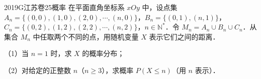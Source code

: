 
\begin{problem}{2019}{G}{江苏卷}{25}{概率}
在平面直角坐标系 $xOy$ 中，设点集 $A_n=\{(0,0),(1,0),(2,0),\cdots,(n,0)\}$，$B_n=\{(0,1),(n,1)\}$，$C_n=\{(0,2),(1,2),(2,2),\cdots,(n,2)\}$，$n\in\mathbb{N}^*$．令 $M_n=A_n\cup B_n\cup C_n$．从集合 $M_n$ 中任取两个不同的点，用随机变量 $X$ 表示它们之间的距离．

（1）当 $n=1$ 时，求 $X$ 的概率分布；

（2）对给定的正整数 $n$（$n\geq3$），求概率 $P(X\leq n)$（用 $n$ 表示）．
\end{problem}